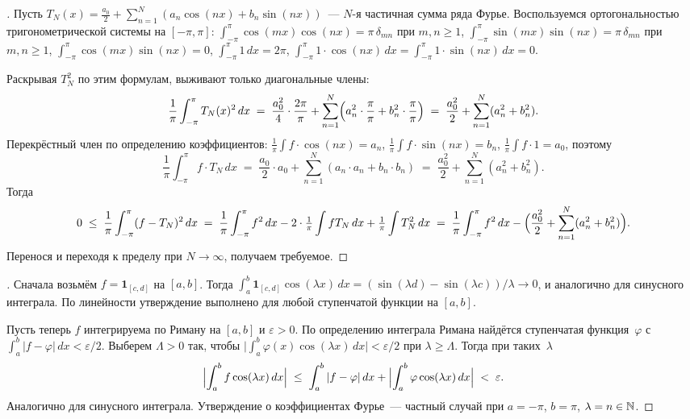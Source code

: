 \begin{proof}[]
Пусть $T_N(x) = \tfrac{a_0}{2} + \sum_{n=1}^{N} (a_n \cos(nx) + b_n \sin(nx))$~---
$N$-я частичная сумма ряда Фурье. Воспользуемся ортогональностью
тригонометрической системы на $[-\pi, \pi]$:
$\int_{-\pi}^{\pi} \cos(mx)\cos(nx) = \pi\,\delta_{mn}$ при $m, n \ge 1$,
$\int_{-\pi}^{\pi} \sin(mx)\sin(nx) = \pi\,\delta_{mn}$ при $m, n \ge 1$,
$\int_{-\pi}^{\pi} \cos(mx)\sin(nx) = 0$, $\int_{-\pi}^{\pi} 1\,dx = 2\pi$,
$\int_{-\pi}^{\pi} 1 \cdot \cos(nx)\,dx = \int_{-\pi}^{\pi} 1 \cdot \sin(nx)\,dx = 0$.

Раскрывая $T_N^2$ по этим формулам, выживают только диагональные члены:
\[
  \frac{1}{\pi} \int_{-\pi}^{\pi} T_N(x)^2\, dx
  \;=\; \frac{a_0^2}{4} \cdot \frac{2\pi}{\pi} + \sum_{n=1}^{N}\Bigl(a_n^2 \cdot \frac{\pi}{\pi} + b_n^2 \cdot \frac{\pi}{\pi}\Bigr)
  \;=\; \frac{a_0^2}{2} + \sum_{n=1}^{N}(a_n^2 + b_n^2).
\]
Перекрёстный член по определению коэффициентов:
$\tfrac{1}{\pi} \int f \cdot \cos(nx) = a_n$, $\tfrac{1}{\pi} \int f \cdot \sin(nx) = b_n$,
$\tfrac{1}{\pi} \int f \cdot 1 = a_0$, поэтому
\[
  \frac{1}{\pi} \int_{-\pi}^{\pi} f \cdot T_N\, dx
  \;=\; \frac{a_0}{2} \cdot a_0 + \sum_{n=1}^{N}(a_n \cdot a_n + b_n \cdot b_n)
  \;=\; \frac{a_0^2}{2} + \sum_{n=1}^{N}(a_n^2 + b_n^2).
\]
Тогда
\[
  0 \;\le\; \frac{1}{\pi} \int_{-\pi}^{\pi} (f - T_N)^2\, dx
  \;=\; \frac{1}{\pi} \int_{-\pi}^{\pi} f^2\, dx - 2 \cdot \tfrac{1}{\pi} \int f T_N\, dx + \tfrac{1}{\pi} \int T_N^2\, dx
  \;=\; \frac{1}{\pi} \int_{-\pi}^{\pi} f^2\, dx
  - \Bigl(\frac{a_0^2}{2} + \sum_{n=1}^{N} (a_n^2 + b_n^2)\Bigr).
\]
Перенося и переходя к пределу при $N \to \infty$, получаем
требуемое.
\end{proof}

\begin{proof}[]
Сначала возьмём $f = \mathbf{1}_{[c, d]}$ на $[a, b]$. Тогда
$\int_{a}^{b} \mathbf{1}_{[c, d]} \cos(\lambda x)\, dx = (\sin(\lambda d) - \sin(\lambda c))/\lambda \to 0$,
и аналогично для синусного интеграла. По линейности утверждение
выполнено для любой ступенчатой функции на $[a, b]$.

Пусть теперь $f$ интегрируема по Риману на $[a, b]$ и
$\varepsilon > 0$. По определению интеграла Римана найдётся
ступенчатая функция~$\varphi$ с
$\int_a^b |f - \varphi|\, dx < \varepsilon/2$. Выберем $\Lambda > 0$
так, чтобы $\bigl|\int_a^b \varphi(x) \cos(\lambda x)\, dx\bigr| < \varepsilon/2$
при $\lambda \ge \Lambda$. Тогда при таких~$\lambda$
\[
  \Bigl|\int_a^b f \cos(\lambda x)\, dx\Bigr|
  \;\le\; \int_a^b |f - \varphi|\, dx + \Bigl|\int_a^b \varphi \cos(\lambda x)\, dx\Bigr|
  \;<\; \varepsilon.
\]
Аналогично для синусного интеграла. Утверждение о коэффициентах
Фурье~--- частный случай при $a = -\pi$, $b = \pi$, $\lambda = n \in \mathbb{N}$.
\end{proof}

